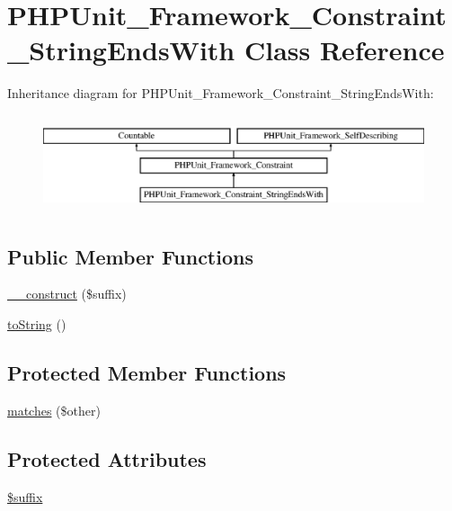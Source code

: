 \hypertarget{class_p_h_p_unit___framework___constraint___string_ends_with}{}\section{P\+H\+P\+Unit\+\_\+\+Framework\+\_\+\+Constraint\+\_\+\+String\+Ends\+With Class Reference}
\label{class_p_h_p_unit___framework___constraint___string_ends_with}
Inheritance diagram for P\+H\+P\+Unit\+\_\+\+Framework\+\_\+\+Constraint\+\_\+\+String\+Ends\+With\+:\begin{figure}[H]
\begin{center}
\leavevmode
\includegraphics[height=2.876712cm]{class_p_h_p_unit___framework___constraint___string_ends_with}
\end{center}
\end{figure}
\subsection*{Public Member Functions}
\begin{DoxyCompactItemize}
\item 
\mbox{\hyperlink{class_p_h_p_unit___framework___constraint___string_ends_with_acb100e0a9f61b2ba2add1d8c862cded4}{\+\_\+\+\_\+construct}} (\$suffix)
\item 
\mbox{\hyperlink{class_p_h_p_unit___framework___constraint___string_ends_with_a5558c5d549f41597377fa1ea8a1cefa3}{to\+String}} ()
\end{DoxyCompactItemize}
\subsection*{Protected Member Functions}
\begin{DoxyCompactItemize}
\item 
\mbox{\hyperlink{class_p_h_p_unit___framework___constraint___string_ends_with_a9c9c337de483bbdbb9fa249a6c7c9cc5}{matches}} (\$other)
\end{DoxyCompactItemize}
\subsection*{Protected Attributes}
\begin{DoxyCompactItemize}
\item 
\mbox{\hyperlink{class_p_h_p_unit___framework___constraint___string_ends_with_a8a4ee1ac7ecdf8ef590598ad43b23e0a}{\$suffix}}
\end{DoxyCompactItemize}


